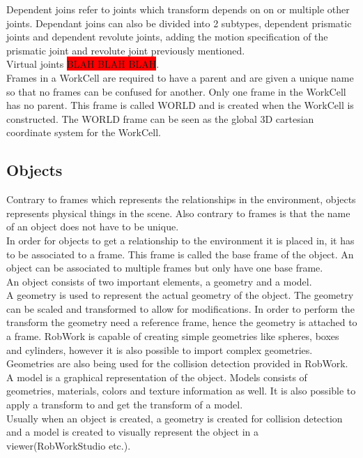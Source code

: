 Dependent joins refer to joints which transform depends on on or multiple other joints. Dependant joins can also be divided into 2 subtypes, dependent prismatic joints and dependent revolute joints, adding the motion specification of the prismatic joint and revolute joint previously mentioned.\\

Virtual joints \colorbox{red}{BLAH BLAH BLAH}.\\

Frames in a WorkCell are required to have a parent and are given a unique name so that no frames can be confused for another. Only one frame in the WorkCell has no parent. This frame is called WORLD and is created when the WorkCell is constructed. The WORLD frame can be seen as the global 3D cartesian coordinate system for the WorkCell.


\subsection{Objects}
Contrary to frames which represents the relationships in the environment, objects represents physical things in the scene. Also contrary to frames is that the name of an object does not have to be unique.\\

In order for objects to get a relationship to the environment it is placed in, it has to be associated to a frame. This frame is called the base frame of the object. An object can be associated to multiple frames but only have one base frame.\\

An object consists of two important elements, a geometry and a model.\\
A geometry is used to represent the actual geometry of the object. The geometry can be scaled and transformed to allow for modifications. In order to perform the transform the geometry need a reference frame, hence the geometry is attached to a frame. RobWork is capable of creating simple geometries like spheres, boxes and cylinders, however it is also possible to import complex geometries. Geometries are also being used for the collision detection provided in RobWork.\\
A model is a graphical representation of the object. Models consists of geometries, materials, colors and texture information as well. It is also possible to apply a transform to and get the transform of a model.\\
Usually when an object is created, a geometry is created for collision detection and a model is created to visually represent the object in a viewer(RobWorkStudio etc.).\\

